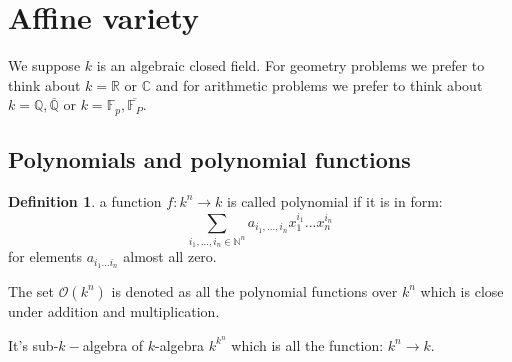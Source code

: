 \documentclass[12pt,a4paper,english]{article}
\theoremstyle{plain}
\theoremstyle{definition}
\newtheorem{defi}{Definition}
\theoremstyle{remark}
\begin{document}
\section{Affine variety}
We suppose $k$ is an algebraic closed field. For geometry problems we prefer to think about $k = \mathbb{R}$ or $\mathbb{C}$ and for arithmetic problems
we prefer to think about $k=\mathbb{Q},\overline{\mathbb{Q}}$ or $k=\mathbb{F}_{p},\overline{\mathbb{F}_{P}}$.
\subsection{Polynomials and polynomial functions}
\begin{defi}
a function $f:k^{n}\rightarrow k$ is called polynomial if it is in form: 
\begin{equation*}
    \sum_{i_{1},...,i_{n}\in \mathbb{N}^{n}}  a_{i_{1},...,i_{n}}x_{1}^{i_{1}}...x_{n}^{i_{n}}
\end{equation*}
for elements $a_{i_{1}...i_{n}}$ almost all zero.

The set $\mathcal{O}(k^{n})$ is denoted as all the polynomial functions over $k^{n}$ which is close under addition and multiplication. 


\end{defi}
It's sub-$k-$algebra of $k$-algebra $k^{k^{n}}$ which is all the function: $k^{n}\rightarrow k$. 
\end{document}
